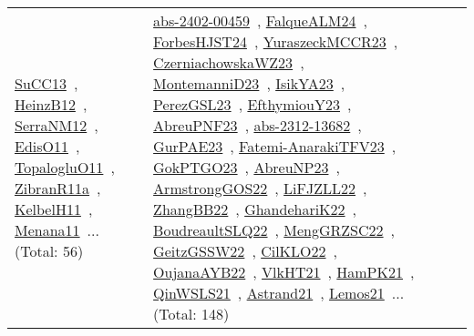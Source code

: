{\begin{longtable}{lp{3cm}>{\raggedright\arraybackslash}p{6cm}>{\raggedright\arraybackslash}p{6cm}>{\raggedright\arraybackslash}p{8cm}}
\href{../works/SuCC13.pdf}{SuCC13}~\cite{SuCC13}, \href{../works/HeinzB12.pdf}{HeinzB12}~\cite{HeinzB12}, \href{../works/SerraNM12.pdf}{SerraNM12}~\cite{SerraNM12}, \href{../works/EdisO11.pdf}{EdisO11}~\cite{EdisO11}, \href{../works/TopalogluO11.pdf}{TopalogluO11}~\cite{TopalogluO11}, \href{../works/ZibranR11a.pdf}{ZibranR11a}~\cite{ZibranR11a}, \href{../works/KelbelH11.pdf}{KelbelH11}~\cite{KelbelH11}, \href{../works/Menana11.pdf}{Menana11}~\cite{Menana11}... (Total: 56) & \href{../works/abs-2402-00459.pdf}{abs-2402-00459}~\cite{abs-2402-00459}, \href{../works/FalqueALM24.pdf}{FalqueALM24}~\cite{FalqueALM24}, \href{../works/ForbesHJST24.pdf}{ForbesHJST24}~\cite{ForbesHJST24}, \href{../works/YuraszeckMCCR23.pdf}{YuraszeckMCCR23}~\cite{YuraszeckMCCR23}, \href{../works/CzerniachowskaWZ23.pdf}{CzerniachowskaWZ23}~\cite{CzerniachowskaWZ23}, \href{../works/MontemanniD23.pdf}{MontemanniD23}~\cite{MontemanniD23}, \href{../works/IsikYA23.pdf}{IsikYA23}~\cite{IsikYA23}, \href{../works/PerezGSL23.pdf}{PerezGSL23}~\cite{PerezGSL23}, \href{../works/EfthymiouY23.pdf}{EfthymiouY23}~\cite{EfthymiouY23}, \href{../works/AbreuPNF23.pdf}{AbreuPNF23}~\cite{AbreuPNF23}, \href{../works/abs-2312-13682.pdf}{abs-2312-13682}~\cite{abs-2312-13682}, \href{../works/GurPAE23.pdf}{GurPAE23}~\cite{GurPAE23}, \href{../works/Fatemi-AnarakiTFV23.pdf}{Fatemi-AnarakiTFV23}~\cite{Fatemi-AnarakiTFV23}, \href{../works/GokPTGO23.pdf}{GokPTGO23}~\cite{GokPTGO23}, \href{../works/AbreuNP23.pdf}{AbreuNP23}~\cite{AbreuNP23}, \href{../works/ArmstrongGOS22.pdf}{ArmstrongGOS22}~\cite{ArmstrongGOS22}, \href{../works/LiFJZLL22.pdf}{LiFJZLL22}~\cite{LiFJZLL22}, \href{../works/ZhangBB22.pdf}{ZhangBB22}~\cite{ZhangBB22}, \href{../works/GhandehariK22.pdf}{GhandehariK22}~\cite{GhandehariK22}, \href{../works/BoudreaultSLQ22.pdf}{BoudreaultSLQ22}~\cite{BoudreaultSLQ22}, \href{../works/MengGRZSC22.pdf}{MengGRZSC22}~\cite{MengGRZSC22}, \href{../works/GeitzGSSW22.pdf}{GeitzGSSW22}~\cite{GeitzGSSW22}, \href{../works/CilKLO22.pdf}{CilKLO22}~\cite{CilKLO22}, \href{../works/OujanaAYB22.pdf}{OujanaAYB22}~\cite{OujanaAYB22}, \href{../works/VlkHT21.pdf}{VlkHT21}~\cite{VlkHT21}, \href{../works/HamPK21.pdf}{HamPK21}~\cite{HamPK21}, \href{../works/QinWSLS21.pdf}{QinWSLS21}~\cite{QinWSLS21}, \href{../works/Astrand21.pdf}{Astrand21}~\cite{Astrand21}, \href{../works/Lemos21.pdf}{Lemos21}~\cite{Lemos21}... (Total: 148)\\

\end{longtable}}
